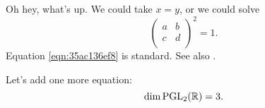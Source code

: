 \documentclass[reqno]{amsart} 
\begin{document}
Oh hey, what's up.  We could take $x = y$, or we could solve
\begin{equation}\label{eqn:35ac136ef8}
  \begin{pmatrix}
    a & b \\
    c & d \\
  \end{pmatrix}^2 = 1.
\end{equation}
Equation \eqref{eqn:35ac136ef8} is standard.  See also \cite{2021arXiv210915230N}.

Let's add one more equation:
\begin{equation*}
\dim \operatorname{PGL}_2(\mathbb{R}) = 3.
\end{equation*}


{} 
\end{document}
